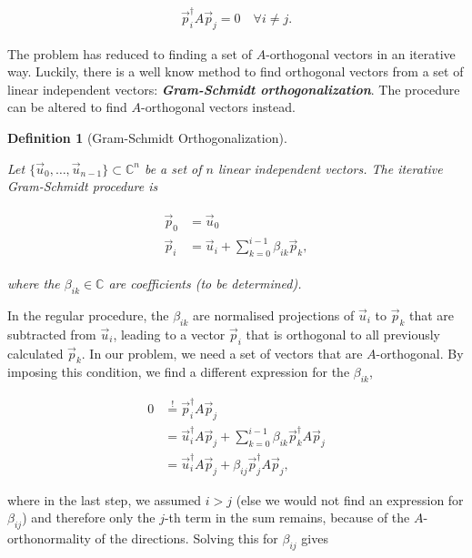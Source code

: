 \documentclass{article}
\theoremstyle{plain} %
\newtheorem{definition}{Definition}[section]
\theoremstyle{convention} %
\theoremstyle{remark} %
\def\df#1{\textbf{\textit{#1}}}
\numberwithin{equation}{section}
\begin{document}
\begin{align*}
    \vec{p}_i^{\dagger} A \vec{p}_j = 0 \quad \forall i \neq j.
\end{align*}

The problem has reduced to finding a set of $A$-orthogonal vectors in an iterative way. Luckily, there is a well know method to find orthogonal vectors from a set of linear independent vectors: \df{Gram-Schmidt orthogonalization}. The procedure can be altered to find $A$-orthogonal vectors instead.

\begin{definition}[Gram-Schmidt Orthogonalization]

\label{df:gramschmidt}

Let $\{ \vec{u}_0, \dots, \vec{u}_{n-1} \} \subset \mathbb{C}^n$ be a set of $n$ linear independent vectors. The iterative Gram-Schmidt procedure is

\begin{align}
    \begin{split}
        \vec{p}_0 &= \vec{u}_0 \label{eq:gramschmidt} \\
        \vec{p}_i &= \vec{u}_i + \sum_{k=0}^{i-1} \beta_{ik} \vec{p}_k,
    \end{split}
\end{align}

where the $\beta_{ik} \in \mathbb{C}$ are coefficients (to be determined).

\end{definition}

In the regular procedure, the $\beta_{ik}$ are normalised projections of $\vec{u}_i$ to $\vec{p}_k$ that are subtracted from $\vec{u}_i$, leading to a vector $\vec{p}_i$ that is orthogonal to all previously calculated $\vec{p}_k$. In our problem, we need a set of vectors that are $A$-orthogonal. By imposing this condition, we find a different expression for the $\beta_{ik}$,

\begin{align*}
    0 &\stackrel{!}{=} \vec{p}_i^{\dagger} A \vec{p}_j \\
                    &= \vec{u}_i^{\dagger} A \vec{p}_j + \sum_{k=0}^{i-1} \beta_{ik} \vec{p}_k^{\dagger} A \vec{p}_j \\
                    &= \vec{u}_i^{\dagger} A \vec{p}_j + \beta_{ij} \vec{p}_j^{\dagger} A \vec{p}_j,
\end{align*}

where in the last step, we assumed $i>j$ (else we would not find an expression for $\beta_{ij}$) and therefore only the $j$-th term in the sum remains, because of the $A$-orthonormality of the directions. Solving this for $\beta_{ij}$ gives
\end{document}

